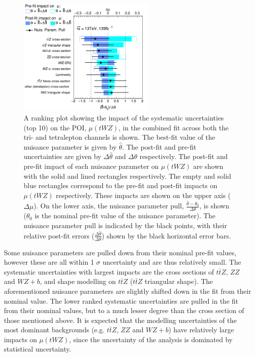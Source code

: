 \begin{figure}[h!]
    \centering
    \includegraphics[width=0.6\textwidth]{figures/combined/RankingSysts_SigXsecOverSM_systs.png}
    \caption{A ranking plot showing the impact of the systematic uncertainties (top 10) on the POI, $\mu (tWZ)$, in the combined fit across both the tri- and tetralepton channels is shown. The best-fit value of the nuisance parameter is given by $\hat{\theta}$. The post-fit and pre-fit uncertainties are given by $\Delta \hat{\theta}$ and $\Delta\theta$ respectively. The post-fit and pre-fit impact of each nuisance parameter on $\mu (tWZ)$ are shown with the solid and lined rectangles respectively. The empty and solid blue rectangles correspond to the pre-fit and post-fit impacts on $\mu (tWZ)$ respectively. These impacts are shown on the upper axis ($\Delta \mu$). On the lower axis, the nuisance parameter pull, $\frac{\hat{\theta} - \theta_{0}}{\Delta{\theta}}$, is shown ($\theta_{0}$ is the nominal pre-fit value of the nuisance parameter). The nuisance parameter pull is indicated by the black points, with their relative post-fit errors ($\frac{\Delta \hat{\theta}}{\Delta \theta}$) shown by the black horizontal error bars.}
    \label{fig:4lep-combined-nuisance-ranking}
\end{figure}Some nuisance parameters are pulled down from their nominal pre-fit values, however these are all within 1 $\sigma$ uncertainty and are thus relatively small. The systematic uncertainties with largest impacts are the cross sections of $t\bar{t}Z$, $ZZ$ and $WZ+b$, and shape modelling on $t\bar{t}Z$ ($t\bar{t}Z$ triangular shape). The aforementioned nuisance parameters are slightly shifted down in the fit from their nominal value. The lower ranked systematic uncertainties are pulled in the fit from their nominal values, but to a much lesser degree than the cross section of those mentioned above. It is expected that the modelling uncertainties of the most dominant backgrounds (e.g. $t\bar{t}Z$, $ZZ$ and $WZ+b$) have relatively large impacts on $\mu(tWZ)$, since the uncertainty of the analysis is dominated by statistical uncertainty.

